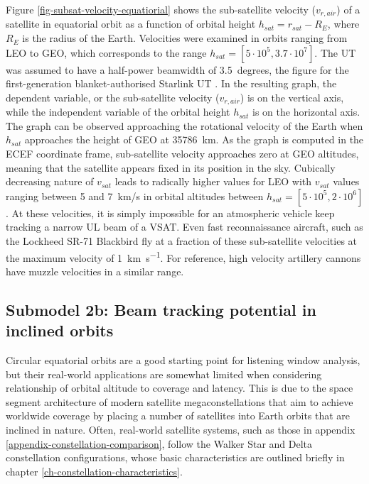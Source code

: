 \documentclass[english, 12pt, a4paper, elec, utf8, a-1b, online]{aaltothesis}
\begin{document}
Figure \ref{fig-subsat-velocity-equatiorial} shows the sub-satellite velocity ($v_{r, air}$) of a satellite in equatorial orbit as a function of orbital height $h_{sat} = r_{sat} - R_{E}$, where $R_{E}$ is the radius of the Earth.
Velocities were examined in orbits ranging from LEO to GEO, which corresponds to the range $h_{sat} = [5 \cdot 10^5, 3.7 \cdot 10^7]$. The UT was assumed to have a half-power beamwidth of 3.5~degrees, the figure for the first-generation blanket-authorised Starlink UT \cite{SpaceX-SES-AMD-20210731-01295}.
In the resulting graph, the dependent variable, or the sub-satellite velocity ($v_{r, air}$) is on the vertical axis, while the independent variable of the orbital height $h_{sat}$ is on the horizontal axis.
The graph can be observed approaching the rotational velocity of the Earth when $h_{sat}$ approaches the height of GEO at \SI{35786}{\kilo\meter}.
As the graph is computed in the ECEF coordinate frame, sub-satellite velocity approaches zero at GEO altitudes, meaning that the satellite appears fixed in its position in the sky.
Cubically decreasing nature of $v_{sat}$ leads to radically higher values for LEO with $v_{sat}$ values ranging between 5 and 7\ km/s in orbital altitudes between $h_{sat} = [5 \cdot 10^5, 2 \cdot 10^6]$.
At these velocities, it is simply impossible for an atmospheric vehicle keep tracking a narrow UL beam of a VSAT.
Even fast reconnaissance aircraft, such as the Lockheed SR-71 Blackbird fly at a fraction of these sub-satellite velocities at the maximum velocity of \SI{1}{\kilo\meter\per\second}.
For reference, high velocity artillery cannons have muzzle velocities in a similar range.

\subsection{Submodel 2b: Beam tracking potential in inclined orbits} \label{ch-results-submodel-2b-tracking-inclined}

Circular equatorial orbits are a good starting point for listening window analysis, but their real-world applications are somewhat limited when considering relationship of orbital altitude to coverage and latency.
This is due to the space segment architecture of modern satellite megaconstellations that aim to achieve worldwide coverage by placing a number of satellites into Earth orbits that are inclined in nature.
Often, real-world satellite systems, such as those in appendix \ref{appendix-constellation-comparison}, follow the Walker Star and Delta constellation configurations, whose basic characteristics are outlined briefly in chapter \ref{ch-constellation-characteristics}.
\end{document}
